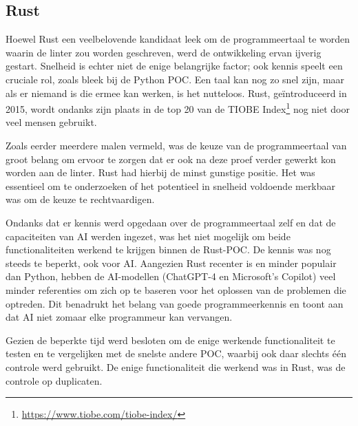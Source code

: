 \subsection{Rust}
Hoewel Rust een veelbelovende kandidaat leek om de programmeertaal te worden waarin de linter zou worden geschreven, werd de ontwikkeling ervan ijverig gestart. Snelheid is echter niet de enige belangrijke factor; ook kennis speelt een cruciale rol, zoals bleek bij de Python \acrshort{POC}. Een taal kan nog zo snel zijn, maar als er niemand is die ermee kan werken, is het nutteloos. Rust, geïntroduceerd in 2015, wordt ondanks zijn plaats in de top 20 van de TIOBE Index\footnote{\url{https://www.tiobe.com/tiobe-index/}} nog niet door veel mensen gebruikt.

Zoals eerder meerdere malen vermeld, was de keuze van de programmeertaal van groot belang om ervoor te zorgen dat er ook na deze proef verder gewerkt kon worden aan de linter. Rust had hierbij de minst gunstige positie. Het was essentieel om te onderzoeken of het potentieel in snelheid voldoende merkbaar was om de keuze te rechtvaardigen.

Ondanks dat er kennis werd opgedaan over de programmeertaal zelf en dat de capaciteiten van \acrshort{AI} werden ingezet, was het niet mogelijk om beide functionaliteiten werkend te krijgen binnen de Rust-\acrshort{POC}. De kennis was nog steeds te beperkt, ook voor \acrshort{AI}. Aangezien Rust recenter is en minder populair dan Python, hebben de \acrshort{AI}-modellen (ChatGPT-4 en Microsoft's Copilot) veel minder referenties om zich op te baseren voor het oplossen van de problemen die optreden. Dit benadrukt het belang van goede programmeerkennis en toont aan dat \acrfull{AI} niet zomaar elke programmeur kan vervangen.

Gezien de beperkte tijd werd besloten om de enige werkende functionaliteit te testen en te vergelijken met de snelste andere \acrshort{POC}, waarbij ook daar slechts één controle werd gebruikt. De enige functionaliteit die werkend was in Rust, was de controle op duplicaten.

